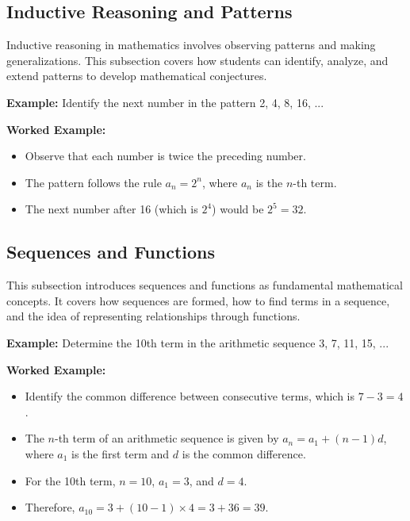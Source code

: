 \documentclass{book}
\begin{document}
\subsection{Inductive Reasoning and Patterns}
Inductive reasoning in mathematics involves observing patterns and making generalizations. This subsection covers how students can identify, analyze, and extend patterns to develop mathematical conjectures.


\textbf{Example:} Identify the next number in the pattern 2, 4, 8, 16, ...


\textbf{Worked Example:}
\begin{itemize}
        \item Observe that each number is twice the preceding number.
        \item The pattern follows the rule \(a_n = 2^n\), where \(a_n\) is the \(n\)-th term.
        \item The next number after 16 (which is \(2^4\)) would be \(2^5 = 32\).
\end{itemize}


\subsection{Sequences and Functions}
This subsection introduces sequences and functions as fundamental mathematical concepts. It covers how sequences are formed, how to find terms in a sequence, and the idea of representing relationships through functions.


\textbf{Example:} Determine the 10th term in the arithmetic sequence 3, 7, 11, 15, ...


\textbf{Worked Example:}
\begin{itemize}
        \item Identify the common difference between consecutive terms, which is \(7 - 3 = 4\).
        \item The \(n\)-th term of an arithmetic sequence is given by \(a_n = a_1 + (n - 1)d\), where \(a_1\) is the first term and \(d\) is the common difference.
        \item For the 10th term, \(n = 10\), \(a_1 = 3\), and \(d = 4\).
        \item Therefore, \(a_{10} = 3 + (10 - 1) \times 4 = 3 + 36 = 39\).
\end{itemize}
\end{document}
